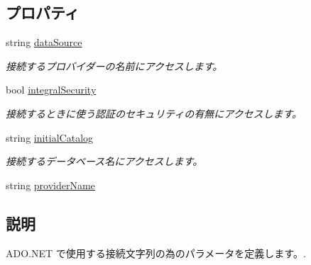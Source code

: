 \subsection*{プロパティ}
\begin{DoxyCompactItemize}
\item 
string \hyperlink{interfacelazurite_1_1relation_1_1common_1_1_i_a_d_o_data_source_abb1ba827134336f1622cd05376bfa797}{dataSource}
\begin{DoxyCompactList}\small\item\em 接続するプロバイダーの名前にアクセスします。 \item\end{DoxyCompactList}\item 
bool \hyperlink{interfacelazurite_1_1relation_1_1common_1_1_i_a_d_o_data_source_a6bbdd4ce8e7e7c36be1af7a17e382b04}{integralSecurity}
\begin{DoxyCompactList}\small\item\em 接続するときに使う認証のセキュリティの有無にアクセスします。 \item\end{DoxyCompactList}\item 
string \hyperlink{interfacelazurite_1_1relation_1_1common_1_1_i_a_d_o_data_source_a27a84f2fbf21b934ded2597f5c99e30c}{initialCatalog}
\begin{DoxyCompactList}\small\item\em 接続するデータベース名にアクセスします。 \item\end{DoxyCompactList}\item 
string \hyperlink{interfacelazurite_1_1relation_1_1common_1_1_i_a_d_o_data_source_a19f2ca3d6bc754ef3e2f2a7ff88f778c}{providerName}
\end{DoxyCompactItemize}


\subsection{説明}
ADO.NET で使用する接続文字列の為のパラメータを定義します。. 

